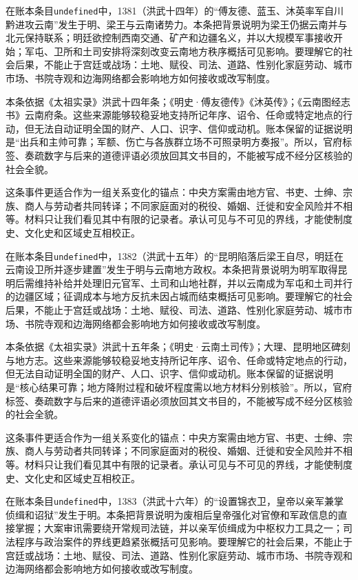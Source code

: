 在账本条目\texttt{undefined}中，1381（洪武十四年）的“傅友德、蓝玉、沐英率军自川黔进攻云南”发生于明、梁王与云南诸势力。本条把背景说明为梁王仍据云南并与北元保持联系；明廷欲控制西南交通、矿产和边疆名义，并以大规模军事接收开始；军屯、卫所和土司安排将深刻改变云南地方秩序概括可见影响。要理解它的社会后果，不能止于宫廷或战场：土地、赋役、司法、道路、性别化家庭劳动、城市市场、书院寺观和边海网络都会影响地方如何接收或改写制度。

本条依据《太祖实录》洪武十四年条；《明史·傅友德传》《沐英传》；《云南图经志书》云南府条。这些来源能够较稳妥地支持所记年序、诏令、任命或特定地点的行动，但无法自动证明全国的财产、人口、识字、信仰或动机。账本保留的证据说明是“出兵和主帅可靠；军额、伤亡与各族群立场不可照录明方奏报”。所以，官府标签、奏疏数字与后来的道德评语必须放回其文书目的，不能被写成不经分区核验的社会全貌。

这条事件更适合作为一组关系变化的锚点：中央方案需由地方官、书吏、士绅、宗族、商人与劳动者共同转译；不同家庭面对的税役、婚姻、迁徙和安全风险并不相等。材料只让我们看见其中有限的记录者。承认可见与不可见的界线，才能使制度史、文化史和区域史互相校正。

在账本条目\texttt{undefined}中，1382（洪武十五年）的“昆明陷落后梁王自尽，明廷在云南设卫所并逐步建置”发生于明与云南地方政权。本条把背景说明为明军取得昆明后需维持补给并处理旧元官军、土司和山地社群，并以云南成为军屯和土司并行的边疆区域；征调成本与地方反抗未因占城而结束概括可见影响。要理解它的社会后果，不能止于宫廷或战场：土地、赋役、司法、道路、性别化家庭劳动、城市市场、书院寺观和边海网络都会影响地方如何接收或改写制度。

本条依据《太祖实录》洪武十五年条；《明史·云南土司传》；大理、昆明地区碑刻与地方志。这些来源能够较稳妥地支持所记年序、诏令、任命或特定地点的行动，但无法自动证明全国的财产、人口、识字、信仰或动机。账本保留的证据说明是“核心结果可靠；地方降附过程和破坏程度需以地方材料分别核验”。所以，官府标签、奏疏数字与后来的道德评语必须放回其文书目的，不能被写成不经分区核验的社会全貌。

这条事件更适合作为一组关系变化的锚点：中央方案需由地方官、书吏、士绅、宗族、商人与劳动者共同转译；不同家庭面对的税役、婚姻、迁徙和安全风险并不相等。材料只让我们看见其中有限的记录者。承认可见与不可见的界线，才能使制度史、文化史和区域史互相校正。

在账本条目\texttt{undefined}中，1383（洪武十六年）的“设置锦衣卫，皇帝以亲军兼掌侦缉和诏狱”发生于明。本条把背景说明为废相后皇帝强化对官僚和军政信息的直接掌握；大案审讯需要绕开常规司法链，并以亲军侦缉成为中枢权力工具之一；司法程序与政治案件的界线更趋紧张概括可见影响。要理解它的社会后果，不能止于宫廷或战场：土地、赋役、司法、道路、性别化家庭劳动、城市市场、书院寺观和边海网络都会影响地方如何接收或改写制度。

